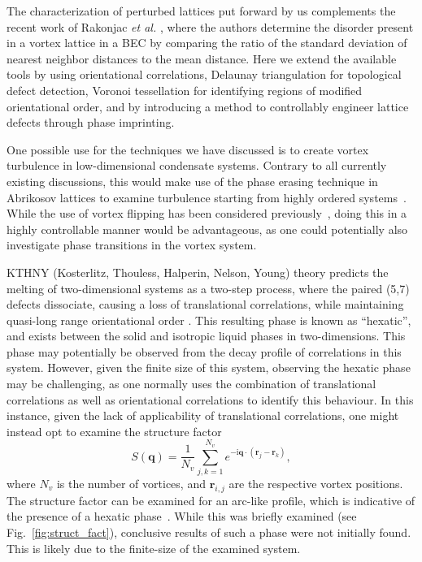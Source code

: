 The characterization of perturbed lattices put forward by us complements the recent work of Rakonjac \textit{et al.} \cite{VTX:Rankonjac_pra_2016}, where the authors determine the disorder present in a vortex lattice in a BEC by comparing the ratio of the standard deviation of nearest neighbor distances to the mean distance. Here we extend the available tools by using orientational correlations, Delaunay triangulation for topological defect detection, Voronoi tessellation for identifying regions of modified orientational order, and by introducing a method to controllably engineer lattice defects through phase imprinting.

One possible use for the techniques we have discussed is to create vortex turbulence in low-dimensional condensate systems. Contrary to all currently existing discussions, this would make use of the phase erasing technique in Abrikosov lattices to examine turbulence starting from highly ordered systems~\cite{VTX:Neely_prl_2013,VTX:Kwon_pra_2014,VTX:Groszek_pra_2016}. While the use of vortex flipping has been considered previously~\cite{VTX:Madarassy_gfd_2009}, doing this in a highly controllable manner would be advantageous, as one could potentially also investigate phase transitions in the vortex system.

KTHNY (Kosterlitz, Thouless, Halperin, Nelson, Young) theory predicts the melting of two-dimensional systems as a two-step process, where the paired (5,7) defects dissociate, causing a loss of translational correlations, while maintaining quasi-long range orientational order \cite{0022-3719-6-7-010, PhysRevLett.41.121, PhysRevB.19.2457, PhysRevB.19.1855, PhysRevLett.114.035702}. This resulting phase is known as ``hexatic'', and exists between the solid and isotropic liquid phases in two-dimensions. This phase may potentially be observed from the decay profile of correlations in this system. However, given the finite size of this system, observing the hexatic phase may be challenging, as one normally uses the combination of translational correlations as well as orientational correlations to identify this behaviour. In this instance, given the lack of applicability of translational correlations, one might instead opt to examine the structure factor \[S(\mathbf{q}) = \frac{1}{N_v}\displaystyle\sum\limits_{j,k=1}^{N_v} e^{-\textrm{i}\mathbf{q}\cdot(\mathbf{r}_j - \mathbf{r}_k)},\] where $N_v$ is the number of vortices, and $\mathbf{r}_{i,j}$ are the respective vortex positions. The structure factor can be examined for an arc-like profile, which is indicative of the presence of a hexatic phase~\cite{CM:Brodin_cmp_2010,CM:Sun_scirep_2016}. While this was briefly examined (see Fig.~\ref{fig:struct_fact}), conclusive results of such a phase were not initially found. This is likely due to the finite-size of the examined system.

